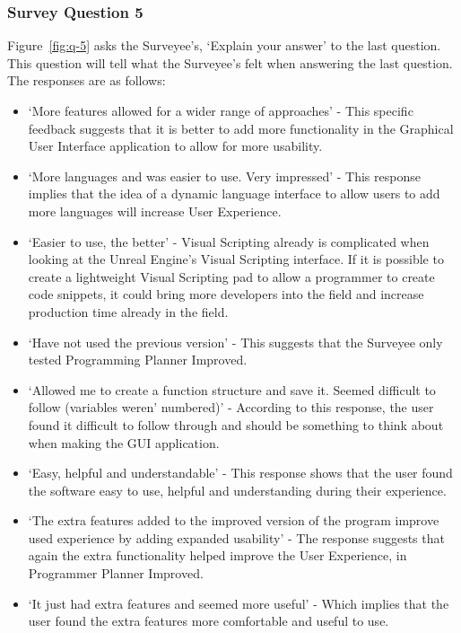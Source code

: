 \documentclass[conference]{IEEEtran}
\begin{document}
        \subsubsection{Survey Question 5} Figure~\ref{fig:q-5} asks the Surveyee's, `Explain your answer' to the last question. This question will tell what the Surveyee's felt when answering the last question. The responses are as follows:
        \begin{itemize}
          \item `More features allowed for a wider range of approaches' - This specific feedback suggests that it is better to add more functionality in the Graphical User Interface application to allow for more usability.
          \item `More languages and was easier to use. Very impressed' - This response implies that the idea of a dynamic language interface to allow users to add more languages will increase User Experience.
          \item `Easier to use, the better' - Visual Scripting already is complicated when looking at the Unreal Engine's Visual Scripting interface. If it is possible to create a lightweight Visual Scripting pad to allow a programmer to create code snippets, it could bring more developers into the field and increase production time already in the field.
          \item `Have not used the previous version' - This suggests that the Surveyee only tested Programming Planner Improved.
          \item `Allowed me to create a function structure and save it. Seemed difficult to follow (variables weren' numbered)' - According to this response, the user found it difficult to follow through and should be something to think about when making the GUI application.
          \item `Easy, helpful and understandable' - This response shows that the user found the software easy to use, helpful and understanding during their experience.
          \item `The extra features added to the improved version of the program improve used experience by adding expanded usability' - The response suggests that again the extra functionality helped improve the User Experience, in Programmer Planner Improved.
          \item `It just had extra features and seemed more useful' - Which implies that the user found the extra features more comfortable and useful to use.
        \end{itemize}
\end{document}
